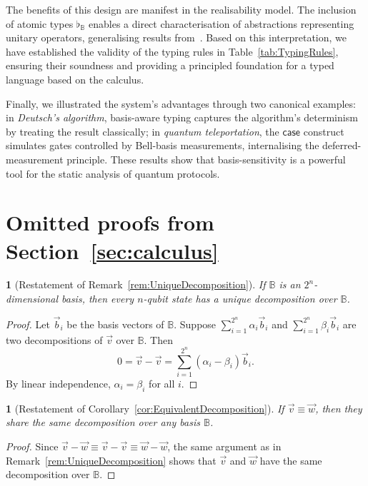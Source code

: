 \documentclass[a4paper,UKenglish,numberwithinsect,pdfa,anonymous]{lipics-v2021}
\theoremstyle{restatestyle}
\newtheorem*{restatecorollary}{}
\newtheorem*{restateremark}{}
\def\BB{\mathbb{B}}
\newcommand\basis[1]{\ensuremath{\flat_{#1}}}
\begin{document}
The benefits of this design are manifest in the realisability model. The inclusion of atomic types $\basis{\BB}$ enables a direct characterisation of abstractions representing unitary operators, generalising results from~\cite{DiazcaroGuillermoMiquelValironLICS19}. Based on this interpretation, we have established the validity of the typing rules in Table~\ref{tab:TypingRules}, ensuring their soundness and providing a principled foundation for a typed language based on the calculus.

Finally, we illustrated the system's advantages through two canonical examples: in \emph{Deutsch's algorithm}, basis-aware typing captures the algorithm's determinism by treating the result classically; in \emph{quantum teleportation}, the $\mathsf{case}$ construct simulates gates controlled by Bell-basis measurements, internalising the deferred-measurement principle. These results show that basis-sensitivity is a powerful tool for the static analysis of quantum protocols.



\appendix

\section{Omitted proofs from Section~\ref{sec:calculus}}\label{sec:appendixA}

\begin{restateremark}[Restatement of Remark~\ref{rem:UniqueDecomposition}]
  \itshape
  If $\BB$ is an $2^n$-dimensional basis, then every $n$-qubit state has
  a unique decomposition over $\BB$.
\end{restateremark}
\begin{proof}
  Let $\vec{b}_{i}$ be the basis vectors of $\BB$. Suppose
  $\sum_{i=1}^{2^n} \alpha_i \vec{b}_{i}$ and $\sum_{i=1}^{2^n} \beta_i \vec{b}_{i}$
  are two decompositions of $\vec{v}$ over $\BB$. Then
  \[
    0=\vec{v}-\vec{v}=\sum_{i=1}^{2^n}(\alpha_i-\beta_i)\vec{b}_{i}.
  \]
  By linear independence, $\alpha_i=\beta_i$ for all $i$.
\end{proof}

\begin{restatecorollary}[Restatement of Corollary~\ref{cor:EquivalentDecomposition}]
  \itshape
  If $\vec{v}\equiv\vec{w}$, then they share the same decomposition over any
  basis $\BB$.
\end{restatecorollary}
\begin{proof}
  Since $\vec{v}-\vec{w}\equiv\vec{v}-\vec{v}\equiv\vec{w}-\vec{w}$, the same
  argument as in Remark~\ref{rem:UniqueDecomposition} shows that $\vec{v}$ and $\vec{w}$ have the same decomposition over $\BB$.
\end{proof}
\end{document}
